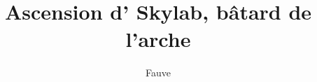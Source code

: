 %
%
%
%



\title{Ascension d’\elena{} Skylab, bâtard de l’arche}
\author{Fauve}
\date{}


\makeatletter
\makeatother
